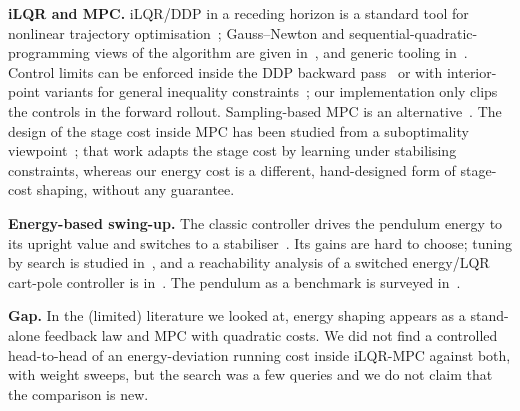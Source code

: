 \textbf{iLQR and MPC.} iLQR/DDP in a receding horizon is a standard tool for nonlinear trajectory optimisation~\cite{tassa2012synthesis}; Gauss--Newton and sequential-quadratic-programming views of the algorithm are given in~\cite{roulet2022iterative,abhijeet2025sequential}, and generic tooling in~\cite{andersson2019casadi}. Control limits can be enforced inside the DDP backward pass~\cite{tassa2014control} or with interior-point variants for general inequality constraints~\cite{pavlov2020interior}; our implementation only clips the controls in the forward rollout. Sampling-based MPC is an alternative~\cite{williams2017information}. The design of the stage cost inside MPC has been studied from a suboptimality viewpoint~\cite{beckenbach2019model}; that work adapts the stage cost by learning under stabilising constraints, whereas our energy cost is a different, hand-designed form of stage-cost shaping, without any guarantee.

\textbf{Energy-based swing-up.} The classic controller drives the pendulum energy to its upright value and switches to a stabiliser~\cite{strm2000swinging}. Its gains are hard to choose; tuning by search is studied in~\cite{lee2019enhancement}, and a reachability analysis of a switched energy/LQR cart-pole controller is in~\cite{jaffar2026reachability}. The pendulum as a benchmark is surveyed in~\cite{boubaker2012inverted}.

\textbf{Gap.} In the (limited) literature we looked at, energy shaping appears as a stand-alone feedback law and MPC with quadratic costs. We did not find a controlled head-to-head of an energy-deviation running cost inside iLQR-MPC against both, with weight sweeps, but the search was a few queries and we do not claim that the comparison is new.
